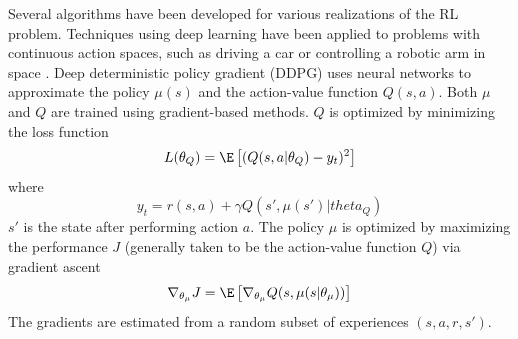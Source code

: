 \documentclass[20pt,margin=1in,innermargin=-6in,blockverticalspace=-0.25in]{tikzposter}
\begin{document}
\begin{columns}
{    Several algorithms have been developed for various realizations of the RL problem. Techniques using deep learning have been applied to problems with continuous action spaces, such as driving a car or controlling a robotic arm in space \cite{lillicrap2015continuous}. Deep deterministic policy gradient (DDPG) uses neural networks to approximate the policy $\mu(s)$ and the action-value function $Q(s,a)$.
    Both $\mu$ and $Q$ are trained using gradient-based methods. $Q$ is optimized by minimizing the loss function
    \begin{equation}\label{eq:critic_loss}
        L(\theta_Q) = \E\left[ (Q(s,a|\theta_Q) - y_t)^2 \right]
    \end{equation}
    where
    \[
    y_t = r(s,a) + \gamma Q(s', \mu(s')|theta_Q)
    \]
    $s'$ is the state after performing action $a$.
    The policy $\mu$ is optimized by maximizing the performance $J$ (generally taken to be the action-value function $Q$) via gradient ascent
    \begin{equation}\label{eq:actor_train}
        \nabla_{\theta_\mu} J = \E\left[
            \nabla_{\theta_\mu} Q(s,\mu(s|\theta_\mu))
        \right]
    \end{equation}
    The gradients are estimated from a random subset of experiences $(s,a,r,s')$.
    
}
\end{columns}
\end{document}
